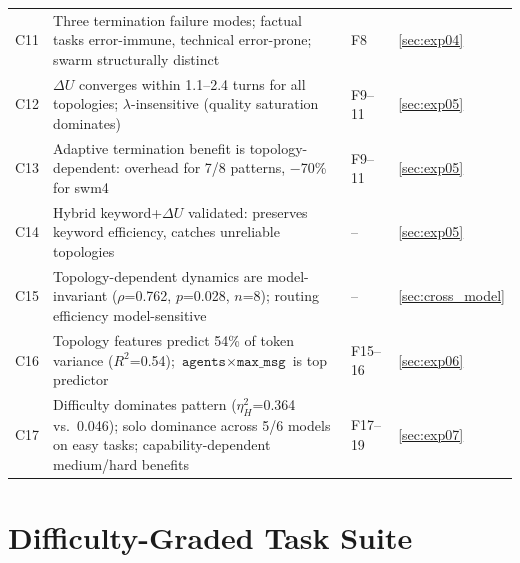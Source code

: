 \documentclass{article}
\begin{document}
\begin{table}[t]
{\begin{tabular}{@{}clll@{}}
C11 & Three termination failure modes; factual tasks error-immune, technical error-prone; swarm structurally distinct & F8 & \ref{sec:exp04} \\
C12 & $\Delta U$ converges within 1.1--2.4 turns for all topologies; $\lambda$-insensitive (quality saturation dominates) & F9--11 & \ref{sec:exp05} \\
C13 & Adaptive termination benefit is topology-dependent: overhead for 7/8 patterns, $-$70\% for swm4 & F9--11 & \ref{sec:exp05} \\
C14 & Hybrid keyword+$\Delta U$ validated: preserves keyword efficiency, catches unreliable topologies & -- & \ref{sec:exp05} \\
C15 & Topology-dependent dynamics are model-invariant ($\rho$=0.762, $p$=0.028, $n$=8); routing efficiency model-sensitive & -- & \ref{sec:cross_model} \\
C16 & Topology features predict 54\% of token variance ($R^2$=0.54); $\texttt{agents} \times \texttt{max\_msg}$ is top predictor & F15--16 & \ref{sec:exp06} \\
C17 & Difficulty dominates pattern ($\eta^2_H$=0.364 vs.\ 0.046); solo dominance across 5/6 models on easy tasks; capability-dependent medium/hard benefits & F17--19 & \ref{sec:exp07} \\
\bottomrule
\end{tabular}
}
\end{table}

\section{Difficulty-Graded Task Suite}
\label{app:difficulty_tasks}
\end{document}
